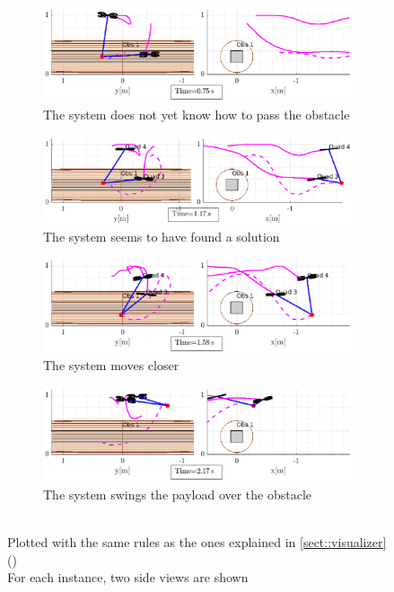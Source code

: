 \begin{figure}
	\centering
	\begin{subfigure}{0.9\textwidth}
		\centering
		\includegraphics[width=\textwidth,trim={0 0 0 1cm},clip]{Figures/highpole/stop}
		\caption{The system does not yet know how to pass the obstacle}
		\label{subfig::highpole::stop}
	\end{subfigure}
	\begin{subfigure}{0.9\textwidth}
		\centering
		\includegraphics[width=\textwidth,trim={0 0 0 1cm},clip]{Figures/highpole/found}
		\caption{The system seems to have found a solution}
		\label{subfig::highpole::found}
	\end{subfigure}
	\begin{subfigure}{0.9\textwidth}
		\centering
		\includegraphics[width=\textwidth,trim={0 0 0 1cm},clip]{Figures/highpole/moving}
		\caption{The system moves closer}
		\label{subfig::highpole::moving}
	\end{subfigure}
	\begin{subfigure}{0.9\textwidth}
		\centering
		\includegraphics[width=\textwidth,trim={0 0 0 1cm},clip]{Figures/highpole/swing}
		\caption{The system swings the payload over the obstacle}
		\label{subfig::highpole::swing}
	\end{subfigure}
	\caption[High swing maneuver]{
		\\Plotted with the same rules as the ones explained in \cref{sect::visualizer} () \\ For each instance, two side views are shown}
	\label{fig::highpole}
	

\end{figure}
